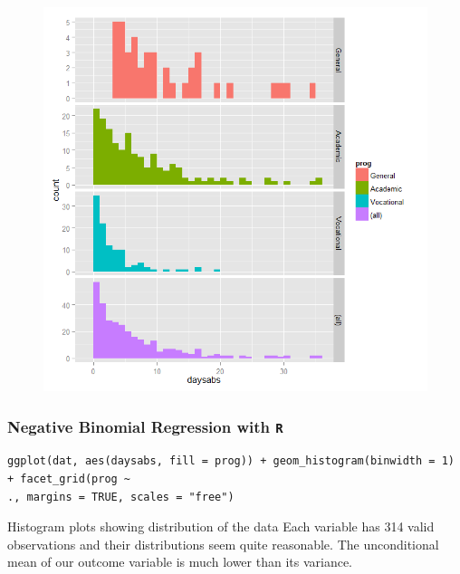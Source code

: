 \documentclass[MASTER.tex]{subfiles}
\begin{document}
\begin{frame}
\begin{figure}
\centering
\includegraphics[width=0.99\linewidth]{negbin1}
\end{figure}

\end{frame}
\begin{frame}[fragile]
	\frametitle{Negative Binomial Regression with \texttt{R} }
	\Large

\begin{verbatim}	
ggplot(dat, aes(daysabs, fill = prog)) + geom_histogram(binwidth = 1) + facet_grid(prog ~ 
., margins = TRUE, scales = "free")
\end{verbatim}
Histogram plots showing distribution of the data
Each variable has 314 valid observations and their distributions seem quite reasonable. The unconditional mean of our outcome variable is much lower than its variance.
\end{frame}
\end{document}
